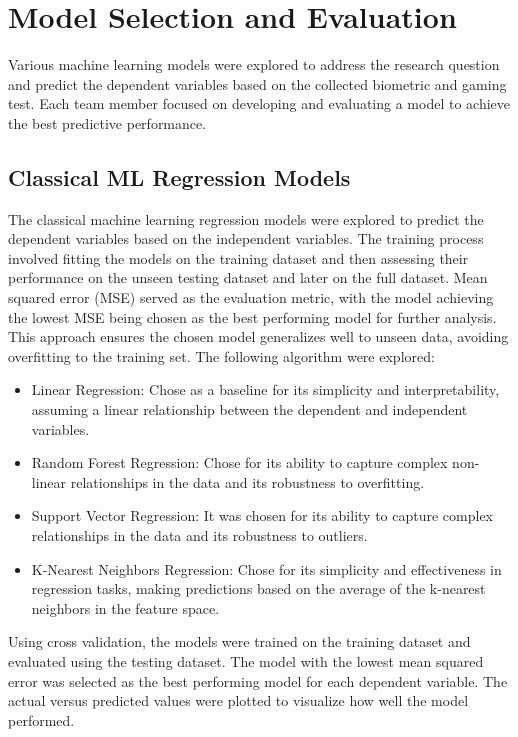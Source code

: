 \section{Model Selection and Evaluation}
Various machine learning models were explored to address the research question and predict the dependent variables based on the collected biometric and gaming test. Each team member
focused on developing and evaluating a model to achieve the best predictive performance.

\subsection{Classical ML Regression Models}
The classical machine learning regression models were explored to predict the dependent variables based on the independent variables.
The training process involved fitting the models on the training dataset and then assessing their performance on the unseen testing dataset and later on the full dataset.
Mean squared error (MSE) served as the evaluation metric,
with the model achieving the lowest MSE being chosen as the best performing model for further analysis. This approach ensures the chosen model generalizes well to unseen data, avoiding
overfitting to the training set. The following algorithm were explored:

\begin{itemize}
    \item Linear Regression: Chose as a baseline for its simplicity and interpretability, assuming a linear relationship between the dependent and independent variables. \cite{poole1971assumptions}
    \item Random Forest Regression: Chose for its ability to capture complex non-linear relationships in the data and its robustness to overfitting. \cite{liu2012new}
    \item Support Vector Regression: It was chosen for its ability to capture complex relationships in the data and its robustness to outliers. \cite{mangasarian2000robust}
    \item K-Nearest Neighbors Regression: Chose for its simplicity and effectiveness in regression tasks, making predictions based on the average of the k-nearest neighbors in the feature space. \cite{song2017efficient}
\end{itemize}

Using cross validation, the models were trained on the training dataset and evaluated using the testing dataset. The model with the lowest mean squared error was selected as the best performing
model for each dependent variable. The actual versus predicted values were plotted to visualize how well the model performed.

